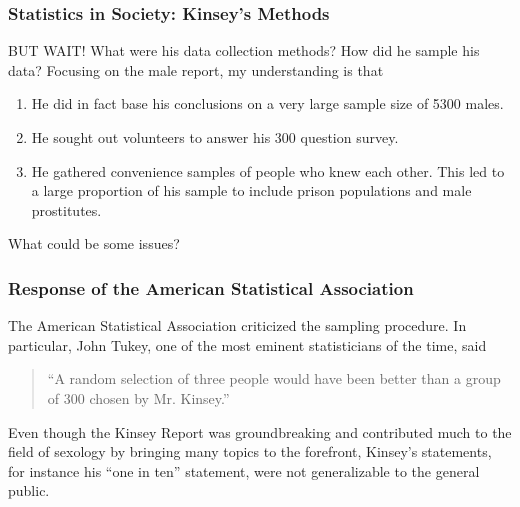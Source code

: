 \documentclass[handout]{beamer}
\newcommand{\blue}[1]{\textcolor{blue2}{#1}}
\begin{document}
\begin{frame}
\frametitle{Statistics in Society: Kinsey's Methods}
BUT WAIT!  What were his data collection methods?  How did he sample his data? Focusing on the male report, my understanding is that 

\begin{enumerate}
\pause \item He did in fact base his conclusions on a very large sample size of 5300 males.
\pause \item He sought out \blue{volunteers} to answer his 300 question survey.
\pause \item He gathered \blue{convenience samples} of people who knew each other.  This led to a large proportion of his sample to include prison populations and male prostitutes.  
\end{enumerate}

\pause \blue{What could be some issues?}

\end{frame}



\begin{frame}
\frametitle{Response of the American Statistical Association}
The American Statistical Association criticized the sampling procedure.  In particular, John Tukey, one of the most eminent statisticians of the time, said

\vspace{0.5cm}

\begin{quotation}
\pause \blue{``A random selection of three people would have been better than a group of 300 chosen by Mr. Kinsey.''}
\end{quotation}

\vspace{0.5cm}

\pause Even though the Kinsey Report was groundbreaking and contributed much to the field of sexology by bringing many topics to the forefront, Kinsey's statements, for instance his ``one in ten'' statement, were not generalizable to the general public.  

\end{frame}
\end{document}
